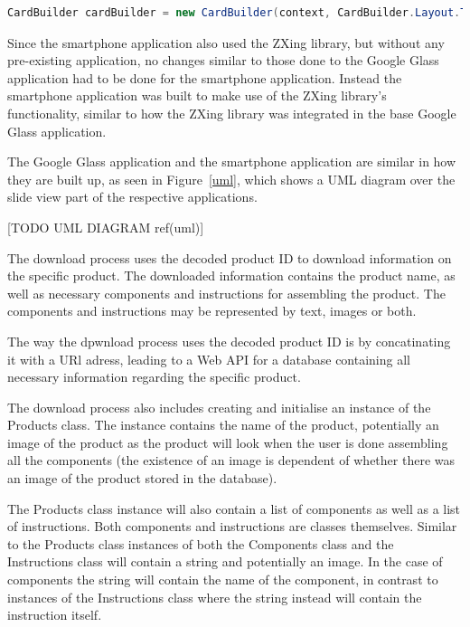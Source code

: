 \begin{lstlisting}[language=Java, caption={Instancing of the recommended class CardBuilder}, label=listingRecommended]
CardBuilder cardBuilder = new CardBuilder(context, CardBuilder.Layout.TITLE);
\end{lstlisting}

Since the smartphone application also used the ZXing library, but without any pre-existing application, no changes similar to those done to the Google Glass application had to be done for the smartphone application. Instead the smartphone application was built to make use of the ZXing library's functionality, similar to how the ZXing library was integrated in the base Google Glass application.

The Google Glass application and the smartphone application are similar in how they are built up, as seen in Figure~\ref{uml}, which shows a UML diagram over the slide view part of the respective applications.

[TODO UML DIAGRAM ref(uml)]




The download process uses the decoded product ID to download information on the specific product. The downloaded information contains the product name, as well as necessary components and instructions for assembling the product. The components and instructions may be represented by text, images or both. 

The way the dpwnload process uses the decoded product ID is by concatinating it with a URl adress, leading to a Web API for a database containing all necessary information regarding the specific product.

The download process also includes creating and initialise an instance of the Products class. The instance contains the name of the product, potentially an image of the product as the product will look when the user is done assembling all the components (the existence of an image is dependent of whether there was an image of the product stored in the database).

The Products class instance will also contain a list of components as well as a list of instructions. Both components and instructions are classes themselves. Similar to the Products class instances of both the Components class and the Instructions class will contain a string and potentially an image. In the case of components the string will contain the name of the component, in contrast to instances of the Instructions class where the string instead will contain the instruction itself.

